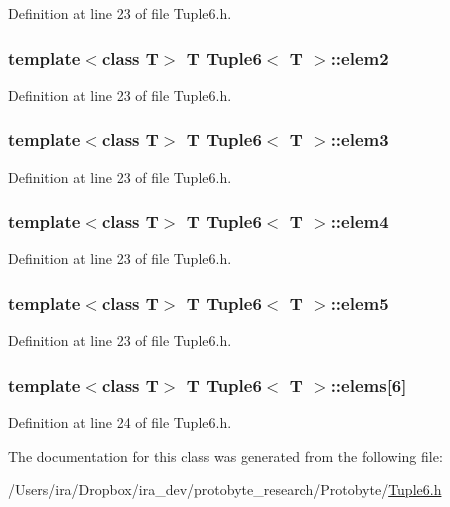 Definition at line 23 of file Tuple6.\-h.

\hypertarget{class_tuple6_a34e39006de023478d27f0ba9a701926a}{
\subsubsection[{elem2}]{\setlength{\rightskip}{0pt plus 5cm}template$<$class T$>$ T {\bf Tuple6}$<$ T $>$\-::elem2}}\label{class_tuple6_a34e39006de023478d27f0ba9a701926a}


Definition at line 23 of file Tuple6.\-h.

\hypertarget{class_tuple6_ac032ddcdf705f7f06f920fbf0687aca2}{
\subsubsection[{elem3}]{\setlength{\rightskip}{0pt plus 5cm}template$<$class T$>$ T {\bf Tuple6}$<$ T $>$\-::elem3}}\label{class_tuple6_ac032ddcdf705f7f06f920fbf0687aca2}


Definition at line 23 of file Tuple6.\-h.

\hypertarget{class_tuple6_aa2cd703b550694d8145b7d6d4db6b78a}{
\subsubsection[{elem4}]{\setlength{\rightskip}{0pt plus 5cm}template$<$class T$>$ T {\bf Tuple6}$<$ T $>$\-::elem4}}\label{class_tuple6_aa2cd703b550694d8145b7d6d4db6b78a}


Definition at line 23 of file Tuple6.\-h.

\hypertarget{class_tuple6_a6c405e93796d0a78f00def3c528036b0}{
\subsubsection[{elem5}]{\setlength{\rightskip}{0pt plus 5cm}template$<$class T$>$ T {\bf Tuple6}$<$ T $>$\-::elem5}}\label{class_tuple6_a6c405e93796d0a78f00def3c528036b0}


Definition at line 23 of file Tuple6.\-h.

\hypertarget{class_tuple6_a791a67308e784978d9b235ff55b5cc69}{
\subsubsection[{elems}]{\setlength{\rightskip}{0pt plus 5cm}template$<$class T$>$ T {\bf Tuple6}$<$ T $>$\-::elems\mbox{[}6\mbox{]}}}\label{class_tuple6_a791a67308e784978d9b235ff55b5cc69}


Definition at line 24 of file Tuple6.\-h.



The documentation for this class was generated from the following file\-:\begin{DoxyCompactItemize}
\item 
/\-Users/ira/\-Dropbox/ira\-\_\-dev/protobyte\-\_\-research/\-Protobyte/\hyperlink{_tuple6_8h}{Tuple6.\-h}\end{DoxyCompactItemize}
